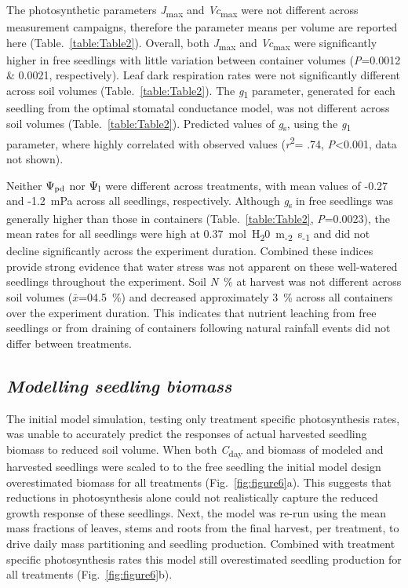 \documentclass[a4paper]{article}\usepackage[]{graphicx}\usepackage[]{color}
\begin{document}
The photosynthetic parameters \textit{J}\textsubscript{max} and \textit{Vc}\textsubscript{max} were not different across measurement campaigns, therefore the parameter means per volume are reported here (Table.~\ref{table:Table2}).  Overall, both \textit{J}\textsubscript{max} and \textit{Vc}\textsubscript{max} were significantly higher in free seedlings with little variation between container volumes (\textit{P}=0.0012 \& 0.0021, respectively). Leaf dark respiration rates were not significantly different across soil volumes (Table.~\ref{table:Table2}). The \textit{g}\textsubscript{1} parameter, generated for each seedling from the \citet{medlyn2012reconciling} optimal stomatal conductance model, was not different across soil volumes (Table.~\ref{table:Table2}). Predicted values of \textit{g}\textsubscript{s}, using the \textit{g}\textsubscript{1} parameter, where highly correlated with observed values (\textit{r}\textsuperscript{2}= .74, \textit{P}\textless0.001, data not shown).

Neither $\Psi\textsubscript{pd}$ nor $\Psi\textsubscript{l}$ were different across treatments, with mean values of -0.27 and -1.2~mPa across all seedlings, respectively. Although \textit{g}\textsubscript{s} in free seedlings was generally higher than those in containers (Table.~\ref{table:Table2}, \textit{P}=0.0023), the mean rates for all seedlings were high at 0.37~mol~H\textsubscript{2}0~m\textsubscript{-2}~s\textsubscript{-1} and did not decline significantly across the experiment duration. Combined these indices provide strong evidence that water stress was not apparent on these well-watered seedlings throughout the experiment. Soil \textit{N}~\% at harvest was not different across soil volumes ($\bar{x}$=04.5~\%) and decreased approximately 3~\% across all containers over the experiment duration. This indicates that nutrient leaching from free seedlings or from draining of containers following natural rainfall events did not differ between treatments. 

\subsection*{\textit{Modelling seedling biomass}}
The initial model simulation, testing only treatment specific photosynthesis rates, was unable to accurately predict the responses of actual harvested seedling biomass to reduced soil volume.  When both \textit{C}\textsubscript{day} and biomass of modeled and harvested seedlings were scaled to to the free seedling the initial model design overestimated biomass for all treatments (Fig.~\ref{fig:figure6}a).  This suggests that reductions in photosynthesis alone could not realistically capture the reduced growth response of these seedlings.  Next, the model was re-run using the mean mass fractions of leaves, stems and roots from the final harvest, per treatment, to drive daily mass partitioning and seedling production.  Combined with treatment specific photosynthesis rates this model still overestimated seedling production for all treatments (Fig.~\ref{fig:figure6}b).  
\end{document}
